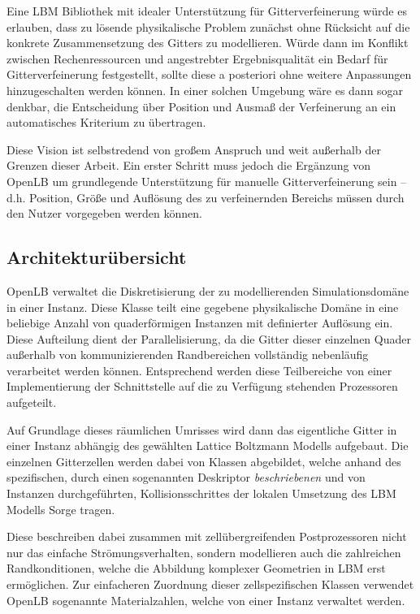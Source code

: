 \bigskip
Eine LBM Bibliothek mit idealer Unterstützung für Gitterverfeinerung würde es erlauben, dass zu lösende physikalische Problem zunächst ohne Rücksicht auf die konkrete Zusammensetzung des Gitters zu modellieren. Würde dann im Konflikt zwischen Rechenressourcen und angestrebter Ergebnisqualität ein Bedarf für Gitterverfeinerung festgestellt, sollte diese a posteriori ohne weitere Anpassungen hinzugeschalten werden können. In einer solchen Umgebung wäre es dann sogar denkbar, die Entscheidung über Position und Ausmaß der Verfeinerung an ein automatisches Kriterium \cite{lagrava15} zu übertragen.

Diese Vision ist selbstredend von großem Anspruch und weit außerhalb der Grenzen dieser Arbeit. Ein erster Schritt muss jedoch die Ergänzung von OpenLB um grundlegende Unterstützung für manuelle Gitterverfeinerung sein -- d.h. Position, Größe und Auflösung des zu verfeinernden Bereichs müssen durch den Nutzer vorgegeben werden können.

\subsection{Architekturübersicht}

OpenLB verwaltet die Diskretisierung der zu modellierenden Simulationsdomäne in einer  Instanz. Diese Klasse teilt eine gegebene physikalische Domäne in eine beliebige Anzahl von quaderförmigen  Instanzen mit definierter Auflösung ein. Diese Aufteilung dient der Parallelisierung, da die Gitter dieser einzelnen Quader außerhalb von kommunizierenden Randbereichen vollständig nebenläufig verarbeitet werden können. Entsprechend werden diese Teilbereiche von einer Implementierung der  Schnittstelle auf die zu Verfügung stehenden Prozessoren aufgeteilt.

Auf Grundlage dieses räumlichen Umrisses wird dann das eigentliche Gitter in einer  Instanz abhängig des gewählten Lattice Boltzmann Modells aufgebaut. Die einzelnen Gitterzellen werden dabei von  Klassen abgebildet, welche anhand des spezifischen, durch einen sogenannten Deskriptor \emph{beschriebenen} und von  Instanzen durchgeführten, Kollisionsschrittes der lokalen Umsetzung des LBM Modells Sorge tragen.

Diese  beschreiben dabei zusammen mit zellübergreifenden Postprozessoren nicht nur das einfache Strömungsverhalten, sondern modellieren auch die zahlreichen Randkonditionen, welche die Abbildung komplexer Geometrien in LBM erst ermöglichen.
Zur einfacheren Zuordnung dieser zellspezifischen Klassen verwendet OpenLB sogenannte Materialzahlen, welche von einer  Instanz verwaltet werden.

